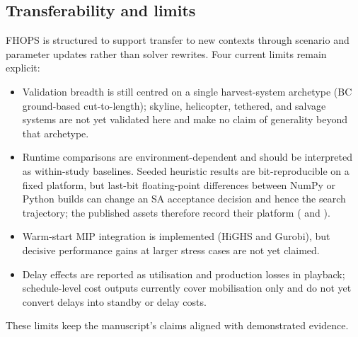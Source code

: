 \subsection{Transferability and limits}
FHOPS is structured to support transfer to new contexts through scenario and parameter updates rather than solver rewrites. Four current limits remain explicit:
\begin{itemize}
  \item Validation breadth is still centred on a single harvest-system archetype (BC ground-based cut-to-length); skyline, helicopter, tethered, and salvage systems are not yet validated here and make no claim of generality beyond that archetype.
  \item Runtime comparisons are environment-dependent and should be interpreted as within-study baselines. Seeded heuristic results are bit-reproducible on a fixed platform, but last-bit floating-point differences between NumPy or Python builds can change an SA acceptance decision and hence the search trajectory; the published assets therefore record their platform ( and ).
  \item Warm-start MIP integration is implemented (HiGHS and Gurobi), but decisive performance gains at larger stress cases are not yet claimed.
  \item Delay effects are reported as utilisation and production losses in playback; schedule-level cost outputs currently cover mobilisation only and do not yet convert delays into standby or delay costs.
\end{itemize}

These limits keep the manuscript's claims aligned with demonstrated evidence.
